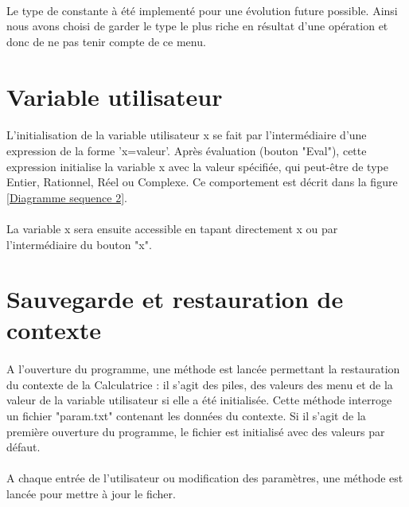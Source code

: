 \documentclass[a4paper,11pt]{report}
\begin{document}
		\paragraph{}Le type de constante à été implementé pour une évolution future possible. Ainsi nous avons choisi de garder le type le plus riche en résultat d'une opération et donc de ne pas tenir compte de ce menu. %

	\section{Variable utilisateur}
		\paragraph{}L'initialisation de la variable utilisateur x se fait par l'intermédiaire d'une expression de la forme 'x=valeur'. Après évaluation (bouton "Eval"), cette expression initialise la variable x avec la valeur spécifiée, qui peut-être de type Entier, Rationnel, Réel ou Complexe. Ce comportement est décrit dans la figure \ref{Diagramme sequence 2}.

		\paragraph{}La variable x sera ensuite accessible en tapant directement x ou par l'intermédiaire du bouton "x".

	\section{Sauvegarde et restauration de contexte}
		\paragraph{}A l'ouverture du programme, une méthode est lancée permettant la restauration du contexte de la Calculatrice : il s'agit des piles, des valeurs des menu et de la valeur de la variable utilisateur si elle a été initialisée. Cette méthode interroge un fichier "param.txt" contenant les données du contexte. Si il s'agit de la première ouverture du programme, le fichier est initialisé avec des valeurs par défaut.

		\paragraph{}A chaque entrée de l'utilisateur ou modification des paramètres, une méthode est lancée pour mettre à jour le ficher.
\end{document}
